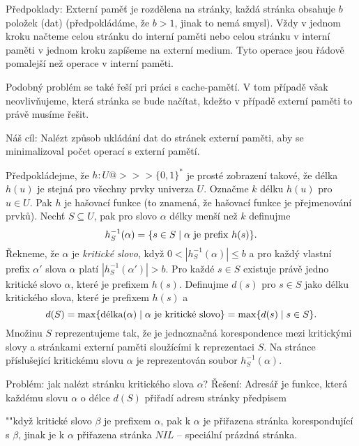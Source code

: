 \documentclass[a4paper,12pt]{article}
\begin{document}
Předpoklady:  Externí paměť je rozdělena na 
stránky, každá stránka obsahuje $b$ položek (dat) 
(předpokládáme, že $b>1$, jinak to nemá smysl).  Vždy v 
jednom kroku načteme celou stránku do interní paměti 
nebo celou stránku v interní paměti v jednom kroku 
zapíšeme na externí medium.  Tyto operace jsou řádově 
pomalejší než operace v interní paměti.  

Podobný problém se také řeší pri práci s cache-pamětí. V tom případě však 
neovlivňujeme, která stránka se bude načítat, kdežto v případě externí paměti to právě musíme řešit.

Náš cíl:  
Nalézt způsob ukládání dat do stránek externí 
paměti, aby se minimalizoval počet operací s externí 
pamětí.  

Předpokládejme, že $h:U@>>>\{0,1\}^{*}$ je prosté 
zobrazení takové, že délka $h(u)$ je stejná pro všechny prvky 
univerza $U$.  Označme $k$ délku $h(u)$ pro $u\in U$. Pak $
h$ je 
hašovací funkce (to znamená, že hašovací funkce je přejmenování prvků).  Nechť $S\subseteq U$, pak pro slovo $
\alpha$ délky 
menší než $k$ definujme 
$$h^{-1}_S(\alpha )=\{s\in S\mid\alpha\text{\rm\ je prefix }h(s)\}
.$$
Řekneme, že $\alpha$ je \emph{kritické} \emph{slovo}, když 
$0<|h^{-1}_S(\alpha )|\le b$ a pro každý vlastní prefix $
\alpha'$ slova $\alpha$ platí 
$|h^{-1}_S(\alpha')|>b$.  Pro každé $s\in S$ existuje právě jedno 
kritické slovo $\alpha$, které je prefixem $h(s)$.  Definujme $
d(s)$ 
pro $s\in S$ jako délku kritického slova, které je prefixem 
$h(s)$ a 
$$d(S)=\max\{\text{\rm délka}(\alpha )\mid\alpha\text{\rm\ je kritické slovo}
\}=\max\{d(s)\mid s\in S\}.$$
Množinu $S$ reprezentujeme tak, že je jednoznačná 
korespondence mezi kritickými slovy a stránkami externí 
paměti slouží\-cí\-mi k reprezentaci $S$.  Na stránce 
příslušející kritickému slovu $\alpha$ je reprezentován soubor 
$h^{-1}_S(\alpha )$.  

Problém: jak nalézt stránku kritického slova 
$\alpha$?\newline 
Řešení: Adresář je funkce, která každému slovu $
\alpha$ o 
délce $d(S)$ přiřadí adresu stránky předpisem
\roster
\item"{}"když kritické slovo $\beta$ je prefixem $\alpha$, pak k $
\alpha$ je 
přiřazena strán\-ka korespondující s $\beta$, jinak je k $
\alpha$ 
přiřazena strán\-ka $NIL$ -- speciální prázdná stránka.
\endroster
\end{document}
